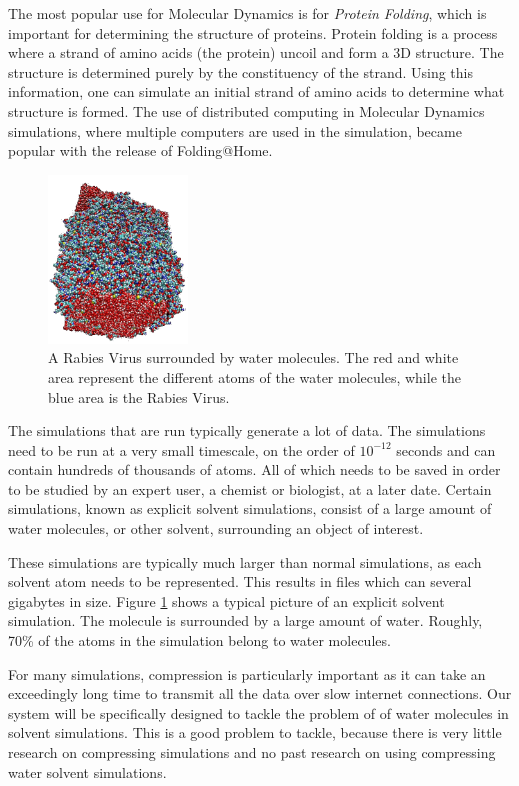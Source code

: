 \documentclass[a4paper,11pt]{report}
\begin{document}
The most popular use for Molecular Dynamics is for \emph{Protein Folding}, which is important for determining the structure of proteins. Protein folding is a process where a strand of amino acids (the protein) uncoil and form a 3D structure. The structure is determined purely by the constituency of the strand. Using this information, one can simulate an initial strand of amino acids to determine what structure is formed. The use of distributed computing in Molecular Dynamics simulations, where multiple computers are used in the simulation, became popular with the release of Folding@Home.\cite{larson2009folding}

\begin{figure}[!h]
 \center
 \includegraphics[width=0.33\textwidth]{resources/Rabies.png}
\caption{A Rabies Virus surrounded by water molecules. The red and white area represent the different atoms of the water molecules, while the blue area is the Rabies Virus.}
\label{introrabmol}
\end{figure}

The simulations that are run typically generate a lot of data. The simulations need to be run at a very small timescale, on the order of $10^{-12}$ seconds and can contain hundreds of thousands of atoms. All of which needs to be saved in order to be studied by an expert user, a chemist or biologist, at a later date. Certain simulations, known as explicit solvent simulations, consist of a large amount of water molecules, or other solvent, surrounding an object of interest. 

These simulations are typically much larger than normal simulations, as each solvent atom needs to be represented. This results in files which can several gigabytes in size. Figure \ref{introrabmol} shows a typical picture of an explicit solvent simulation. The molecule is surrounded by a large amount of water. Roughly, 70\% of the atoms in the simulation belong to water molecules.

For many simulations, compression is particularly important as it can take an exceedingly long time to transmit all the data over slow internet connections. Our system will be specifically designed to tackle the problem of of water molecules in solvent simulations. This is a good problem to tackle, because there is very little research on compressing simulations and no past research on using compressing water solvent simulations.
\end{document}
